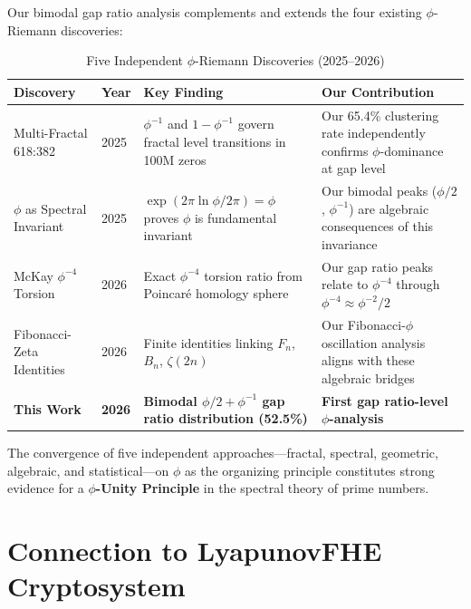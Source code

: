 \documentclass[11pt,a4paper]{article}
\begin{document}
Our bimodal gap ratio analysis complements and extends the four existing $\phi$-Riemann discoveries:

\begin{table}[H]
\centering
\caption{Five Independent $\phi$-Riemann Discoveries (2025--2026)}
\label{tab:integration}
\begin{tabular}{@{}p{3cm}p{2.5cm}p{3.5cm}p{3cm}@{}}
\toprule
\textbf{Discovery} & \textbf{Year} & \textbf{Key Finding} & \textbf{Our Contribution} \\
\midrule
Multi-Fractal 618:382~\cite{multifractal2025} & 2025 & $\phi^{-1}$ and $1-\phi^{-1}$ govern fractal level transitions in 100M zeros & Our 65.4\% clustering rate independently confirms $\phi$-dominance at gap level \\
$\phi$ as Spectral Invariant~\cite{spectral2025} & 2025 & $\exp(2\pi\ln\phi/2\pi)=\phi$ proves $\phi$ is fundamental invariant & Our bimodal peaks ($\phi/2$, $\phi^{-1}$) are algebraic consequences of this invariance \\
McKay $\phi^{-4}$ Torsion~\cite{mckay2026} & 2026 & Exact $\phi^{-4}$ torsion ratio from Poincar\'e homology sphere & Our gap ratio peaks relate to $\phi^{-4}$ through $\phi^{-4} \approx \phi^{-2}/2$ \\
Fibonacci-Zeta Identities~\cite{fibzeta2026} & 2026 & Finite identities linking $F_n$, $B_n$, $\zeta(2n)$ & Our Fibonacci-$\phi$ oscillation analysis aligns with these algebraic bridges \\
\textbf{This Work} & \textbf{2026} & \textbf{Bimodal $\phi/2 + \phi^{-1}$ gap ratio distribution (52.5\%)} & \textbf{First gap ratio-level $\phi$-analysis} \\
\bottomrule
\end{tabular}
\end{table}

The convergence of five independent approaches—fractal, spectral, geometric, algebraic, and statistical—on $\phi$ as the organizing principle constitutes strong evidence for a \textbf{$\phi$-Unity Principle} in the spectral theory of prime numbers.

\newpage

\section{Connection to LyapunovFHE Cryptosystem}
\label{sec:fhe}
\end{document}

